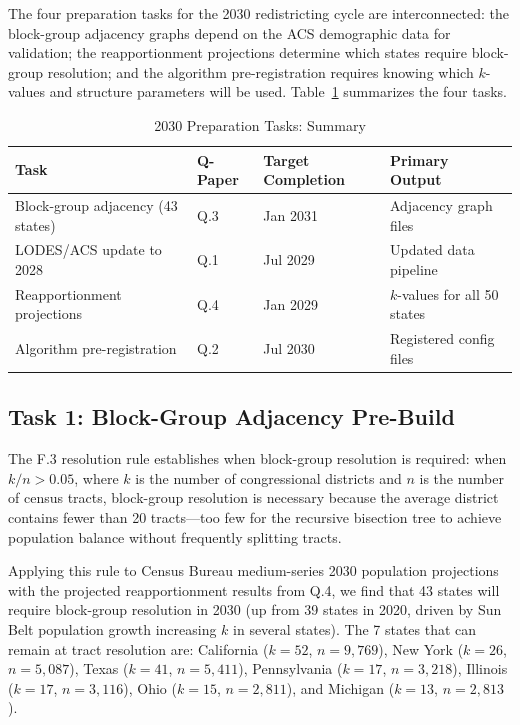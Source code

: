 \label{sec:preparation}

The four preparation tasks for the 2030 redistricting cycle are interconnected:
the block-group adjacency graphs depend on the ACS demographic data for validation;
the reapportionment projections determine which states require block-group resolution;
and the algorithm pre-registration requires knowing which $k$-values and structure
parameters will be used. Table~\ref{tab:tasks} summarizes the four tasks.

\begin{table}[ht]
\centering
\caption{2030 Preparation Tasks: Summary}
\label{tab:tasks}
\begin{tabular}{llll}
\toprule
Task & Q-Paper & Target Completion & Primary Output \\
\midrule
Block-group adjacency (43 states) & Q.3 & Jan 2031 & Adjacency graph files \\
LODES/ACS update to 2028 & Q.1 & Jul 2029 & Updated data pipeline \\
Reapportionment projections & Q.4 & Jan 2029 & $k$-values for all 50 states \\
Algorithm pre-registration & Q.2 & Jul 2030 & Registered config files \\
\bottomrule
\end{tabular}
\end{table}

\subsection{Task 1: Block-Group Adjacency Pre-Build}

The F.3 resolution rule establishes when block-group resolution is required: when
$k/n > 0.05$, where $k$ is the number of congressional districts and $n$ is the
number of census tracts, block-group resolution is necessary because the average
district contains fewer than 20 tracts---too few for the recursive bisection tree
to achieve population balance without frequently splitting tracts.

Applying this rule to Census Bureau medium-series 2030 population projections with
the projected reapportionment results from Q.4, we find that 43 states will require
block-group resolution in 2030 (up from 39 states in 2020, driven by Sun Belt
population growth increasing $k$ in several states). The 7 states that can remain
at tract resolution are: California ($k=52$, $n=9{,}769$), New York ($k=26$,
$n=5{,}087$), Texas ($k=41$, $n=5{,}411$), Pennsylvania ($k=17$, $n=3{,}218$),
Illinois ($k=17$, $n=3{,}116$), Ohio ($k=15$, $n=2{,}811$), and Michigan ($k=13$,
$n=2{,}813$).

